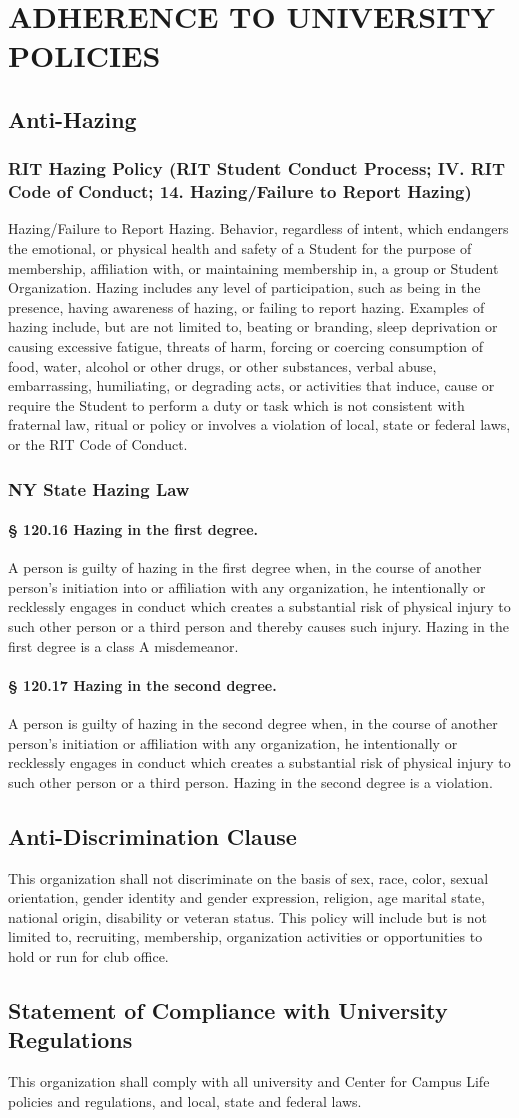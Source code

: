 \documentclass{article}
\newcommand{\article}[1]{\section{#1} \label{#1}}
\newcommand{\asection}[1]{\subsection{#1} \label{#1}}
\newcommand{\asubsection}[1]{\subsubsection{#1} \label{#1}}
\newcommand{\asubsubsection}[1]{\paragraph{#1} \label{#1}}
\begin{document}
\article{ADHERENCE TO UNIVERSITY POLICIES}
\asection{Anti-Hazing}
\asubsection{RIT Hazing Policy (RIT Student Conduct Process; IV. RIT Code of Conduct; 14. Hazing/Failure to Report
Hazing)}
Hazing/Failure to Report Hazing.
Behavior, regardless of intent, which endangers the emotional, or physical health and safety of a Student for the purpose of membership, affiliation with, or maintaining membership in, a group or Student Organization. Hazing includes any level of participation, such as being in the presence, having awareness of hazing, or failing to report hazing.
Examples of hazing include, but are not limited to, beating or branding, sleep deprivation or causing excessive fatigue, threats of harm, forcing or coercing consumption of food, water, alcohol or other drugs, or other substances, verbal abuse, embarrassing, humiliating, or degrading acts, or activities that induce, cause or require the Student to perform a duty or task which is not consistent with fraternal law, ritual or policy or involves a violation of local, state or federal laws, or the RIT Code of Conduct.
\asubsection{NY State Hazing Law}
\asubsubsection{§ 120.16 Hazing in the first degree.}
A person is guilty of hazing in the first degree when, in the course of
another person's initiation into or affiliation with any organization, he intentionally or recklessly engages in
conduct which creates a substantial risk of physical injury to such other person or a third person and thereby
causes such injury. Hazing in the first degree is a class A misdemeanor.
\asubsubsection{§ 120.17 Hazing in the second degree.}
A person is guilty of hazing in the second degree when, in the course of another person's initiation or affiliation with any organization, he intentionally or recklessly engages in conduct which creates a substantial risk of physical injury to such other person or a third person.
Hazing in the second degree is a violation.

\asection{Anti-Discrimination Clause}
This organization shall not discriminate on the basis of sex, race, color, sexual orientation, gender identity and gender expression, religion, age marital state, national origin, disability or veteran status.
This policy will include but is not limited to, recruiting, membership, organization activities or opportunities to hold or run for club office.

\asection{Statement of Compliance with University Regulations}
This organization shall comply with all university and Center for Campus Life policies and regulations, and local, state and federal laws.
\end{document}
